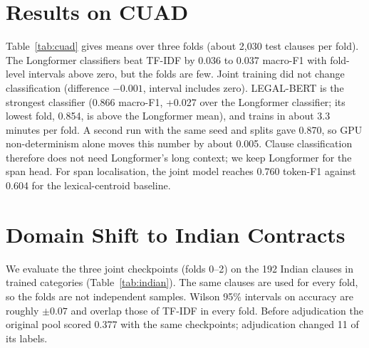 \documentclass[conference]{IEEEtran}
\begin{document}
\section{Results on CUAD}\label{sec:cuad}
Table~\ref{tab:cuad} gives means over three folds (about 2,030 test clauses per fold). The Longformer classifiers beat TF-IDF by 0.036 to 0.037 macro-F1 with fold-level intervals above zero, but the folds are few. Joint training did not change classification (difference $-0.001$, interval includes zero). LEGAL-BERT is the strongest classifier (0.866 macro-F1, +0.027 over the Longformer classifier; its lowest fold, 0.854, is above the Longformer mean), and trains in about 3.3 minutes per fold. A second run with the same seed and splits gave 0.870, so GPU non-determinism alone moves this number by about 0.005. Clause classification therefore does not need Longformer's long context; we keep Longformer for the span head. For span localisation, the joint model reaches 0.760 token-F1 against 0.604 for the lexical-centroid baseline.

\begin{table}[t]
\caption{CUAD, 3-fold contract-grouped CV (mean $\pm$ s.d.; 12 categories scored).}\label{tab:cuad}
\centering
{}
\end{table}

\section{Domain Shift to Indian Contracts}\label{sec:indian}
We evaluate the three joint checkpoints (folds 0--2) on the 192 Indian clauses in trained categories (Table~\ref{tab:indian}). The same clauses are used for every fold, so the folds are not independent samples. Wilson 95\% intervals on accuracy are roughly $\pm0.07$ and overlap those of TF-IDF in every fold. Before adjudication the original pool scored 0.377 with the same checkpoints; adjudication changed 11 of its labels.
\end{document}
